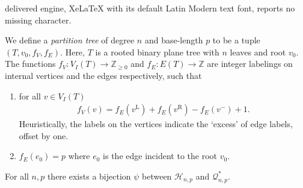 \documentclass[10pt,a4paper]{amsart}
\newcommand{\Z}{\mathbb{Z}}
\begin{document}
delivered engine, XeLaTeX with its default Latin Modern text font, reports no missing character.
\begin{definition}
    We define a \emph{partition tree} of degree $n$ and base-length $p$ to be a tuple $(T,v_0,f_V,f_E)$. 
    Here, $T$ is a rooted binary plane tree with $n$ leaves and root $v_0$. 
    The functions $f_V: V_I(T)\rightarrow \Z_{\geq0}$ and $f_E: E(T)\rightarrow\Z$ are integer labelings on internal vertices and the edges respectively, such that
    \begin{enumerate}[label=(P.\arabic*)]
        \item\label{enumitem:sum_condition} for all $v\in V_I(T)$ 
        \begin{align}\label{eq:fV_fE_relation}
            f_V(v)=f_E(v^\textrm{L})+f_E(v^\textrm{R}) - f_E(v^-)+1.
        \end{align}
        Heuristically, the labels on the vertices indicate the `excess' of edge labels, offset by one.
        \item\label{enumitem:root_label} $f_E(e_0)=p$ where $e_0$ is the edge incident to the root $v_0$.
    \end{enumerate}
\end{definition}

\begin{proposition}\label{prop:H_Q*_bij}
    For all $n,p$ there exists a bijection $\psi$ between $\mathcal{H}_{n,p}$ and $\mathcal{Q}^*_{n,p}$.
\end{proposition}
\end{document}
